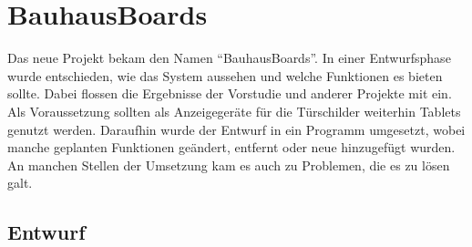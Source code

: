 \chapter{BauhausBoards}\label{BauhausBoards}
Das neue Projekt bekam den Namen ``BauhausBoards''.
In einer Entwurfsphase wurde entschieden, wie das System aussehen und welche Funktionen es bieten sollte. Dabei flossen die Ergebnisse der Vorstudie und anderer Projekte mit ein.
\\
Als Voraussetzung sollten als Anzeigegeräte für die Türschilder weiterhin Tablets genutzt werden.
Daraufhin wurde der Entwurf in ein Programm umgesetzt, wobei manche geplanten Funktionen geändert, entfernt oder neue hinzugefügt wurden.
An manchen Stellen der Umsetzung kam es auch zu Problemen, die es zu lösen galt.
\\


\section{Entwurf}\label{Entwurf}
